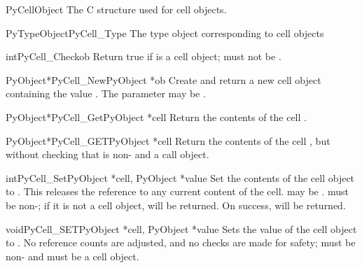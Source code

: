 \begin{ctypedesc}{PyCellObject}
  The C structure used for cell objects.
\end{ctypedesc}

\begin{cvardesc}{PyTypeObject}{PyCell_Type}
  The type object corresponding to cell objects
\end{cvardesc}

\begin{cfuncdesc}{int}{PyCell_Check}{ob}
  Return true if  is a cell object;  must not be
  \NULL.
\end{cfuncdesc}

\begin{cfuncdesc}{PyObject*}{PyCell_New}{PyObject *ob}
  Create and return a new cell object containing the value .
  The parameter may be \NULL.
\end{cfuncdesc}

\begin{cfuncdesc}{PyObject*}{PyCell_Get}{PyObject *cell}
  Return the contents of the cell .
\end{cfuncdesc}

\begin{cfuncdesc}{PyObject*}{PyCell_GET}{PyObject *cell}
  Return the contents of the cell , but without checking
  that  is non-\NULL{} and a call object.
\end{cfuncdesc}

\begin{cfuncdesc}{int}{PyCell_Set}{PyObject *cell, PyObject *value}
  Set the contents of the cell object  to .  This
  releases the reference to any current content of the cell.
   may be \NULL.   must be non-\NULL; if it is
  not a cell object,  will be returned.  On success, 
  will be returned.
\end{cfuncdesc}

\begin{cfuncdesc}{void}{PyCell_SET}{PyObject *cell, PyObject *value}
  Sets the value of the cell object  to .  No
  reference counts are adjusted, and no checks are made for safety;
   must be non-\NULL{} and must be a cell object.
\end{cfuncdesc}

